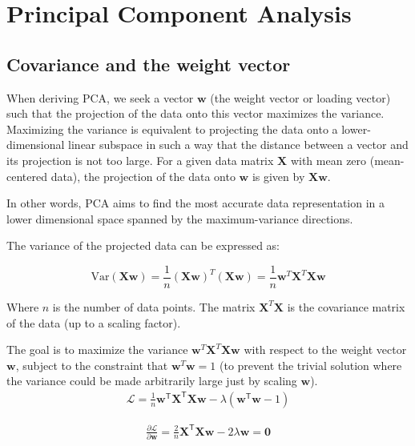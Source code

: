 \section{Principal Component Analysis}
\subsection{Covariance and the weight vector}

When deriving PCA, we seek a vector \( \mathbf{w} \) (the weight vector or loading vector) such that the projection of the data onto this vector maximizes the variance. Maximizing the variance is equivalent to projecting the data onto a lower-dimensional linear subspace in such a way that the distance between a vector and its projection is not too large. For a given data matrix \( \mathbf{X} \) with mean zero (mean-centered data), the projection of the data onto \( \mathbf{w} \) is given by \( \mathbf{X}\mathbf{w} \).

In other words, PCA aims to find the most accurate data representation in a lower dimensional space spanned by the maximum-variance directions.

The variance of the projected data can be expressed as:

\[
\text{Var}(\mathbf{X}\mathbf{w}) = \frac{1}{n} (\mathbf{X}\mathbf{w})^T (\mathbf{X}\mathbf{w}) = \frac{1}{n} \mathbf{w}^T \mathbf{X}^T \mathbf{X} \mathbf{w}
\]

Where \( n \) is the number of data points. The matrix \( \mathbf{X}^T \mathbf{X} \) is the covariance matrix of the data (up to a scaling factor).

The goal is to maximize the variance \( \mathbf{w}^T \mathbf{X}^T \mathbf{X} \mathbf{w} \) with respect to the weight vector \( \mathbf{w} \), subject to the constraint that \( \mathbf{w}^T \mathbf{w} = 1 \) (to prevent the trivial solution where the variance could be made arbitrarily large just by scaling \( \mathbf{w} \)).
\begin{align*}
	\mathcal{L} = \frac{1}{n} \mathbf{w}^\mathsf{T} \mathbf{X}^\mathsf{T} \mathbf{X} \mathbf{w} - \lambda \left( \mathbf{w}^\mathsf{T} \mathbf{w}  - 1 \right)
\end{align*}

\begin{align*}
	\frac{\partial \mathcal{L}}{\partial \mathbf{w}} = \frac{2}{n} \mathbf{X}^\mathsf{T} \mathbf{X} \mathbf{w} - 2 \lambda \mathbf{w} = \mathbf{0}
\end{align*}

